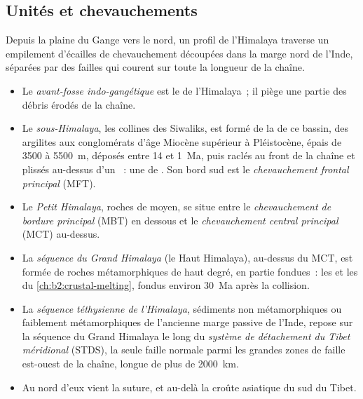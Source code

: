 \subsection{Unités et chevauchements}

Depuis la plaine du Gange vers le nord, un profil de l'Himalaya traverse un empilement d'écailles de chevauchement
découpées dans la marge nord de l'Inde, séparées par des failles qui courent sur toute la longueur de la chaîne.
\begin{itemize}
\item Le \emph{avant-fosse indo-gangétique} est le 
de l'Himalaya~; il piège une partie des débris érodés de la chaîne.
\item Le \emph{sous-Himalaya}, les collines des Siwaliks, est formé de la  de ce
bassin, des argilites aux conglomérats d'âge Miocène supérieur à Pléistocène, épais de
3500 à \qty{5500}{m}, déposés entre 14 et \qty{1}{Ma}, puis raclés au front de la chaîne
et plissés au-dessus d'un ~: une  de
. Son bord sud est le \emph{chevauchement frontal principal} (MFT).
\item Le \emph{Petit Himalaya}, roches de  moyen, se situe entre le \emph{chevauchement
de bordure principal} (MBT) en dessous et le \emph{chevauchement central principal} (MCT) au-dessus.
\item La \emph{séquence du Grand Himalaya} (le Haut Himalaya), au-dessus du MCT, est formée
de roches métamorphiques de haut degré, en partie fondues~: les  et les
 du \cref{ch:b2:crustal-melting}, fondus environ \qty{30}{Ma} après la collision.
\item La \emph{séquence téthysienne de l'Himalaya}, sédiments non métamorphiques ou faiblement
métamorphiques de l'ancienne marge passive de l'Inde, repose sur la séquence du Grand Himalaya
le long du \emph{système de détachement du Tibet méridional} (STDS), la seule faille normale
parmi les grandes zones de faille est-ouest de la chaîne, longue de plus de \qty{2000}{km}.
\item Au nord d'eux vient la suture, et au-delà la croûte asiatique du sud du Tibet.
\end{itemize}

